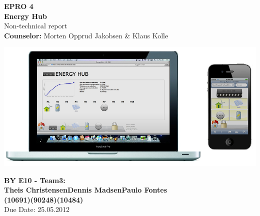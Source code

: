\begin{centering}
\thispagestyle{empty}
\begin{center}
\textbf{\Huge {EPRO 4\\[0.1cm]}Energy Hub}\\
\huge {Non-technical report}\\ \vspace{0.4cm}
\large{\textbf{Counselor:} Morten Opprud Jakobsen \& Klaus Kolle}\\ \vspace{0.0cm}
\end{center}

\centering
\includegraphics[width=1\textwidth]{images/frontpage.png}
\end{centering}

\begin{center}
\vspace{0.4cm}
\Large{\textbf{BY E10 - Team3: \\ \vspace{0.2cm}Theis Christensen\hspace{1.5cm}Dennis Madsen\hspace{1.5cm}Paulo Fontes}
\\\textbf{(10691)\hspace{3.7cm}(90248)\hspace{3.7cm}(10484)}}
\\\vspace{3.0cm}Due Date: 25.05.2012
\end{center}

\newpage
\thispagestyle{empty}
\mbox{}